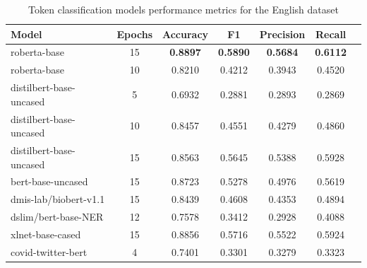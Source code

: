 \documentclass{Configuration_Files/PoliMi3i_thesis}
\begin{document}
\begin{table}[H]
    \centering
    \begin{tabular}{lcccccc}
        \hline
        \textbf{Model} & \textbf{Epochs} & \textbf{Accuracy} & \textbf{F1} & \textbf{Precision} & \textbf{Recall} \\
        \hline
        roberta-base & 15 & \textbf{0.8897} & \textbf{0.5890} & \textbf{0.5684} & \textbf{0.6112} \\
        roberta-base & 10 & 0.8210 & 0.4212 & 0.3943 & 0.4520 \\
        distilbert-base-uncased & 5 & 0.6932 & 0.2881 & 0.2893 & 0.2869 \\  
        distilbert-base-uncased & 10 & 0.8457 & 0.4551 & 0.4279 & 0.4860 \\  
        distilbert-base-uncased & 15 & 0.8563 & 0.5645 & 0.5388 & 0.5928 \\  
        bert-base-uncased & 15 & 0.8723 & 0.5278 & 0.4976 & 0.5619 \\  
        dmis-lab/biobert-v1.1 & 15 & 0.8439 & 0.4608 & 0.4353 & 0.4894 \\  
        dslim/bert-base-NER & 12 & 0.7578 & 0.3412 & 0.2928 & 0.4088 \\
        xlnet-base-cased & 15 & 0.8856 & 0.5716 & 0.5522 & 0.5924 \\
        covid-twitter-bert & 4 & 0.7401 & 0.3301 & 0.3279 & 0.3323 \\
        \hline 
    \end{tabular}
    \caption{\small Token classification models performance metrics for the English dataset}
    \label{tab:performance_train_en_T2}
\end{table}
\end{document}
